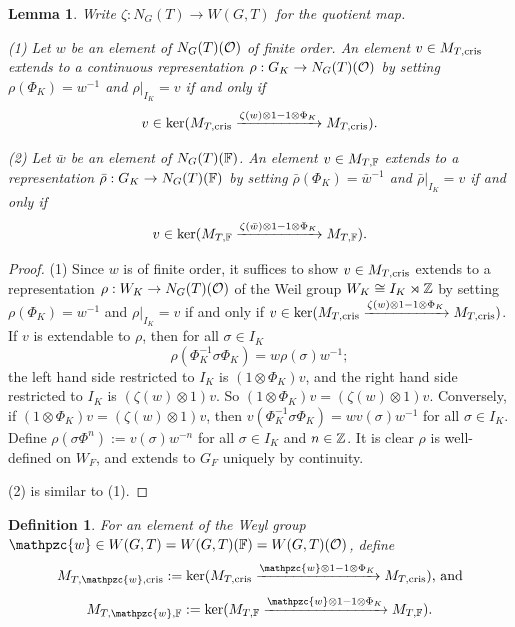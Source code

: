 \documentclass[10pt,a4paper,twoside]{article}
\newtheorem{lem}{Lemma}
\newtheorem{dfn}{Definition}
\begin{document}
\begin{lem}
\label{lem:extendable}
Write $\zeta: N_G(T) \to W(G,T)$ for the quotient map.

(1)
Let $w$ be an element of $N_G(T)(\mathcal{O})$ of finite order.
An element $v\in M_{T,\operatorname{cris}}$ extends to
a continuous representation $\rho: G_K \to N_G(T)(\mathcal{O})$
by setting $\rho(\Phi_K)=w^{-1}$ and $\rho|_{I_K} = v$
if and only if
$$v \in \ker(M_{T,\operatorname{cris}} \xrightarrow{\zeta(w) \otimes 1 - 1 \otimes \Phi_K} M_{T,\operatorname{cris}}).$$

(2)
Let $\bar w$ be an element of $N_G(T)({\mathbb{F}})$.
An element $v\in M_{T,{\mathbb{F}}}$ extends to
a representation $\bar\rho: G_K \to N_G(T)({\mathbb{F}})$
by setting $\bar\rho(\Phi_K)=\bar w^{-1}$ and $\bar\rho|_{I_K} = v$
if and only if
$$v \in \ker(M_{T,{\mathbb{F}}} \xrightarrow{\zeta(\bar w) \otimes 1 - 1 \otimes \Phi_K} M_{T,{\mathbb{F}}}).$$
\end{lem}

\begin{proof}
(1)
Since $w$ is of finite order,
it suffices to show
$v\in M_{T,\operatorname{cris}}$ extends to
a representation $\rho: W_K \to N_G(T)(\mathcal{O})$ of the Weil group $W_K \cong I_K \rtimes {\mathbb{Z}}$
by setting $\rho(\Phi_K)=w^{-1}$ and $\rho|_{I_K} = v$
if and only if
$v \in \ker(M_{T,\operatorname{cris}} \xrightarrow{\zeta(w) \otimes 1 - 1 \otimes \Phi_K} M_{T,\operatorname{cris}})$.
If $v$ is extendable to $\rho$, then for all $\sigma\in I_K$
$$\rho(\Phi_K^{-1} \sigma \Phi_K) = w \rho(\sigma) w^{-1};$$
the left hand side restricted to $I_K$ is $(1\otimes \Phi_K) v$,
and the right hand side restricted to $I_K$ is $(\zeta(w) \otimes 1) v$.
So $(1\otimes \Phi_K) v = (\zeta(w) \otimes 1) v$.
Conversely, if 
$(1\otimes \Phi_K) v = (\zeta(w) \otimes 1) v$, then
$v(\Phi_K^{-1} \sigma \Phi_K) = w v(\sigma) w^{-1}$
for all $\sigma\in I_K$.
Define $\rho(\sigma \Phi^n):=v(\sigma)w^{-n}$ for all $\sigma\in I_K$ and $n\in {\mathbb{Z}}$.
It is clear $\rho$ is well-defined on $W_F$, and extends to $G_F$ uniquely by continuity.

(2) is similar to (1).
\end{proof}



\begin{dfn}
For an element of the Weyl group $\mathpzc{w} \in W(G,T) = W(G,T)(\bF) = W(G,T)(\cO)$,
define 
$$
M_{T, \mathpzc{w}, \cris} := \ker(M_{T,\cris} \xrightarrow{\mathpzc{w} \otimes 1 - 1 \otimes \Phi_K} M_{T,\cris})
\text{, and}
$$
$$
M_{T, \mathpzc{w}, \modp} := \ker(M_{T,\modp} \xrightarrow{\mathpzc{w}\otimes 1 - 1 \otimes \Phi_K} M_{T,\modp}).
$$
\end{dfn}
\end{document}
